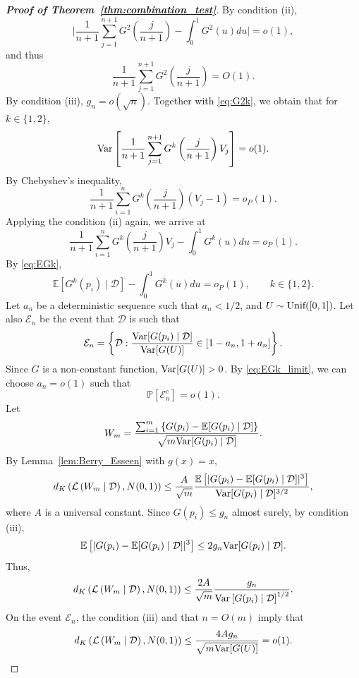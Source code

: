\documentclass[11pt]{article}
\newcommand{\Unif}{\textnormal{Unif}}
\newcommand{\Var}{\textnormal{Var}}
\def\E{\mathbb{E}}
\renewcommand{\P}{\mathbb{P}}
\begin{document}
\begin{proof}[\textbf{Proof of Theorem~\ref{thm:combination_test}}]
By condition (ii), 
\[\bigg|\frac{1}{n+1}\sum_{j=1}^{n + 1}G^{2}\left(\frac{j}{n+1}\right) - \int_0^1 G^2(u)du\bigg| = o(1),\]
and thus
\[\frac{1}{n+1}\sum_{j=1}^{n + 1}G^{2}\left(\frac{j}{n+1}\right) = O(1).\]
By condition (iii), $g_{n} = o(\sqrt{n})$. Together with \eqref{eq:G2k}, we obtain that for $k\in \{1, 2\}$,
\[\Var\left[\frac{1}{n+1}\sum_{j=1}^{n+1}G^k\left(\frac{j}{n+1}\right)V_{j}\right] = o(1).\]
By Chebyshev's inequality, 
\[\frac{1}{n+1}\sum_{i=1}^{n}G^{k}\left(\frac{j}{n+1}\right)(V_{j} - 1) = o_{P}(1).\]
Applying the condition (ii) again, we arrive at
\begin{equation*}
\frac{1}{n+1}\sum_{i=1}^{n}G^{k}\left(\frac{j}{n+1}\right)V_{j} - \int_{0}^{1}G^k(u)du = o_{P}(1).    
\end{equation*}
By \eqref{eq:EGk},
\begin{equation}\label{eq:EGk_limit}
\E\left[G^k(p_i)\mid \mathcal{D}\right] - \int_{0}^{1}G^k(u)du = o_{P}(1), \qquad k\in \{1, 2\}.
\end{equation}
Let $a_{n}$ be a deterministic sequence such that $a_{n} < 1 / 2$, and $U\sim \Unif([0, 1])$. Let also $\mathcal{E}_{n}$ be the event that $\mathcal{D}$ is such that
\begin{equation}\label{eq:event_Var}
    \mathcal{E}_{n} = \left\{\mathcal{D}: \frac{\Var[G(p_i)\mid \mathcal{D}]}{\Var[G(U)]}\in [1 - a_{n}, 1 + a_{n}]\right\}.
\end{equation}
Since $G$ is a non-constant function, $\Var[G(U)] > 0$. By \eqref{eq:EGk_limit}, we can choose $a_n = o(1)$ such that
\[\P\left[\mathcal{E}_{n}^c\right] = o(1).\]
Let 
\[W_{m} = \frac{\sum_{i=1}^{m}\left\{G(p_i) - \E[G(p_i)\mid \mathcal{D}]\right\}}{\sqrt{m\Var[G(p_i)\mid \mathcal{D}]}}.\]
By Lemma~\ref{lem:Berry_Esseen} with $g(x) = x$, 
\[d_{K}\left(\mathcal{L}\left(W_{m}\mid \mathcal{D}\right), N(0, 1)\right)\le \frac{A}{\sqrt{m}}\frac{\E\left[|G(p_i) - \E[G(p_i)\mid \mathcal{D}]|^3\right]}{\Var[G(p_i)\mid \mathcal{D}]^{3/2}},\]
where $A$ is a universal constant. Since $G(p_i)\le g_{n}$ almost surely, by condition (iii), 
\[\E\left[|G(p_i) - \E[G(p_i)\mid \mathcal{D}]|^3\right]\le 2g_{n}\Var[G(p_i)\mid \mathcal{D}].\]
Thus, 
\[d_{K}\left(\mathcal{L}\left(W_{m}\mid \mathcal{D}\right), N(0, 1)\right)\le \frac{2A}{\sqrt{m}}\frac{g_{n}}{\Var\left[G(p_i)\mid \mathcal{D}\right]^{1/2}}.\]
On the event $\mathcal{E}_{n}$, the condition (iii) and that $n = O(m)$ imply that
\begin{equation*}
  d_{K}\left(\mathcal{L}\left(W_{m}\mid \mathcal{D}\right), N(0, 1)\right)\le \frac{4Ag_{n}}{\sqrt{m\Var[G(U)]}} = o(1).  

\end{equation*}
\end{proof}
\end{document}
